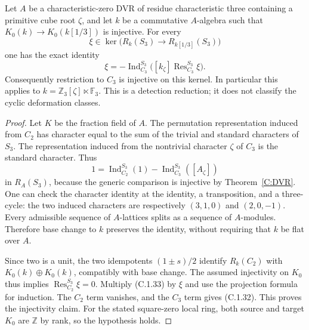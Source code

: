 \begin{lemma}
\label{C:S3_cyclic_detection}
Let $A$ be a characteristic-zero DVR of residue characteristic
three containing a primitive cube root $\zeta$, and let $k$ be
a commutative $A$-algebra such that
$K_0(k)\to K_0(k[1/3])$ is injective.
For every
\[
 \xi\in\ker\bigl(R_k(S_3)\longrightarrow R_{k[1/3]}(S_3)\bigr)
\]
one has the exact identity
\[
 \xi=-\operatorname{Ind}_{C_3}^{S_3}
       \bigl([k_\zeta]\operatorname{Res}_{C_3}^{S_3}\xi\bigr).
                                                        \tag{C.1.32}
\]
Consequently restriction to $C_3$ is injective on this kernel.
In particular this applies to
$k=\mathbb Z_3[\zeta]\ltimes\mathbb F_3$.
This is a detection reduction; it does not classify the cyclic
deformation classes.
\end{lemma}
\begin{proof}
Let $K$ be the fraction field of $A$.
The permutation representation induced from $C_2$ has character
equal to the sum of the trivial and standard characters of
$S_3$. The representation induced from the nontrivial character
$\zeta$ of $C_3$ is the standard character. Thus
\[
 1=\operatorname{Ind}_{C_2}^{S_3}(1)
       -\operatorname{Ind}_{C_3}^{S_3}([A_\zeta])
                                                        \tag{C.1.33}
\]
in $R_A(S_3)$, because the generic comparison is injective by
Theorem~\ref{C:DVR}. One can check the character identity at
the identity, a transposition, and a three-cycle: the two
induced characters are respectively $(3,1,0)$ and $(2,0,-1)$.
Every admissible sequence of $A$-lattices splits as a sequence
of $A$-modules. Therefore base change to $k$ preserves the
identity, without requiring that $k$ be flat over $A$.

Since two is a unit, the two idempotents $(1\pm s)/2$ identify
$R_k(C_2)$ with $K_0(k)\oplus K_0(k)$, compatibly with base
change. The assumed injectivity on $K_0$ thus implies
$\operatorname{Res}_{C_2}^{S_3}\xi=0$.
Multiply (C.1.33) by $\xi$ and use the projection formula for
induction. The $C_2$ term vanishes, and the $C_3$ term gives
(C.1.32). This proves the injectivity claim.
For the stated square-zero local ring, both source and target
$K_0$ are $\mathbb Z$ by rank, so the hypothesis holds.
\end{proof}

